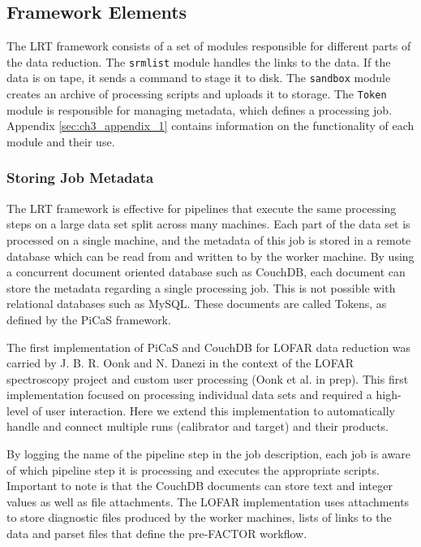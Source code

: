 \subsection{Framework Elements}
The LRT framework consists of a set of modules responsible for different parts of the data reduction. The \verb|srmlist| module handles the links to the data. If the data is on tape, it sends a command to stage it to disk. The \verb|sandbox| module creates an archive of processing scripts and uploads it to storage. The \verb|Token| module is responsible for managing metadata, which defines a processing job. Appendix \ref{sec:ch3_appendix_1} contains information on the functionality of each module and their use. 

\subsubsection{Storing Job Metadata}

The LRT framework is effective for pipelines that execute the same processing steps on a large data set split across many machines. Each part of the data set is processed on a single machine, and the metadata of this job is stored in a remote database which can be read from and written to by the worker machine. By using a concurrent document oriented database such as CouchDB\cite{couchdb}, each document can store the metadata regarding a single processing job. This is not possible with relational databases such as MySQL.  These documents are called Tokens, as defined by the PiCaS framework\cite{picas}.

The first implementation of PiCaS and CouchDB for LOFAR data reduction was carried by J. B. R. Oonk and N. Danezi in the context of the LOFAR spectroscopy project and custom user processing (Oonk et al. in prep). This first implementation focused on processing individual data sets and required a high-level of user interaction. Here we extend this implementation to automatically handle and connect multiple runs (calibrator and target) and their products.


By logging the name of the pipeline step in the job description, each job is aware of which pipeline step it is processing and executes the appropriate scripts. Important to note is that the CouchDB documents can store text and integer values as well as file attachments. The LOFAR implementation uses attachments to store diagnostic files produced by the worker machines, lists of links to the data and parset files that define the pre-FACTOR workflow. 

